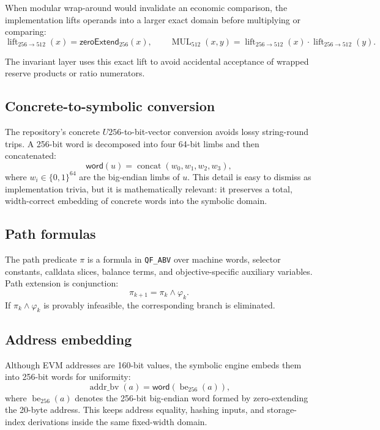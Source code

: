 \documentclass[11pt]{article}
\numberwithin{equation}{section}
\theoremstyle{remark}
\newcommand{\QFABV}{\texttt{QF\_ABV}}
\newcommand{\Bits}[1]{\{0,1\}^{#1}}
\newcommand{\Path}{\pi}
\newcommand{\Word}{\mathsf{word}}
\newcommand{\zeroextend}{\mathsf{zeroExtend}}
\newcommand{\Lift}[2]{\operatorname{lift}_{#1 \rightarrow #2}}
\begin{document}
When modular wrap-around would invalidate an economic comparison, the implementation lifts operands into a larger exact domain before multiplying or comparing:
\begin{equation}
\label{eq:lift512}
\Lift{256}{512}(x) = \zeroextend_{256}(x),
\qquad
\operatorname{MUL}_{512}(x,y) = \Lift{256}{512}(x)\cdot \Lift{256}{512}(y).
\end{equation}

The invariant layer uses this exact lift to avoid accidental acceptance of wrapped reserve products or ratio numerators.

\subsection{Concrete-to-symbolic conversion}

The repository's concrete \(U256\)-to-bit-vector conversion avoids lossy string-round trips. A 256-bit word is decomposed into four 64-bit limbs and then concatenated:
\begin{equation}
\label{eq:u256-pack}
\Word(u)
=
\operatorname{concat}(w_0, w_1, w_2, w_3),
\end{equation}
where \(w_i \in \Bits{64}\) are the big-endian limbs of \(u\). This detail is easy to dismiss as implementation trivia, but it is mathematically relevant: it preserves a total, width-correct embedding of concrete words into the symbolic domain.

\subsection{Path formulas}

The path predicate \(\Path\) is a formula in \QFABV{} over machine words, selector constants, calldata slices, balance terms, and objective-specific auxiliary variables. Path extension is conjunction:
\begin{equation}
\label{eq:path-extension}
\Path_{k+1} = \Path_k \land \varphi_k.
\end{equation}
If \(\Path_k \land \varphi_k\) is provably infeasible, the corresponding branch is eliminated.

\subsection{Address embedding}

Although EVM addresses are 160-bit values, the symbolic engine embeds them into 256-bit words for uniformity:
\begin{equation}
\label{eq:address-embed}
\operatorname{addr\_bv}(a) = \Word(\operatorname{be}_{256}(a)),
\end{equation}
where \(\operatorname{be}_{256}(a)\) denotes the 256-bit big-endian word formed by zero-extending the 20-byte address. This keeps address equality, hashing inputs, and storage-index derivations inside the same fixed-width domain.
\end{document}
